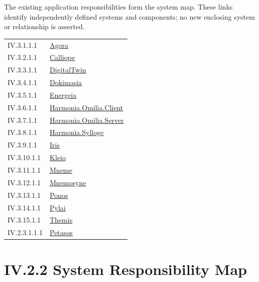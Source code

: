 The existing application responsibilities form the system map. These links identify independently defined systems and components; no new enclosing system or relationship is asserted.\par
\begin{longtable}{p{.22\linewidth}p{.73\linewidth}}
IV.3.1.1.1 & \hyperref[element:d1c4053e68384080b8eb79d2008632ba]{Agora} \\
IV.3.2.1.1 & \hyperref[element:466ad8f75a954c0581b5bba090443849]{Calliope} \\
IV.3.3.1.1 & \hyperref[element:3f64d339648246e99e8866c8089f8960]{DigitalTwin} \\
IV.3.4.1.1 & \hyperref[element:d739c75dffe2453081735710b285f03b]{Dokimasia} \\
IV.3.5.1.1 & \hyperref[element:fb3f37a6ac614415ac486a6de9d35994]{Energeia} \\
IV.3.6.1.1 & \hyperref[element:33b8421ffc444b78b2d059201a58a688]{Harmonia.Omilia.Client} \\
IV.3.7.1.1 & \hyperref[element:369907025d06492bb414a72cea834a77]{Harmonia.Omilia.Server} \\
IV.3.8.1.1 & \hyperref[element:feea742463b84021b66853d287d8916f]{Harmonia.Sylloge} \\
IV.3.9.1.1 & \hyperref[element:e927c1af96c64fcd979be659bee2cbe3]{Iris} \\
IV.3.10.1.1 & \hyperref[element:fefda110e2274884ad58906733606efd]{Kleio} \\
IV.3.11.1.1 & \hyperref[element:1af8a56358f7429fabfb57be66542a99]{Mneme} \\
IV.3.12.1.1 & \hyperref[element:7985e647bf9e4ca3ba70faf9e3e4ae02]{Mnemosyne} \\
IV.3.13.1.1 & \hyperref[element:b521762c1ea444b48cd5f66be3752d30]{Ponos} \\
IV.3.14.1.1 & \hyperref[element:e3e4147fea3640198dc251ed41ee854d]{Pylai} \\
IV.3.15.1.1 & \hyperref[element:899d34ec491948b68aad09e507dea6d1]{Themis} \\
IV.2.3.1.1.1 & \hyperref[element:195e5f10db8e419391354197b5d7a8cc]{Petasos} \\
\end{longtable}
\section*{IV.2.2 System Responsibility Map}
\label{navigation:IV.2.2}

